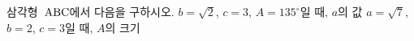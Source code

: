 삼각형~$\mathrm{ABC}$에서 다음을 구하시오.
 $b=\sqrt{2}$, $c=3$, $A=135^\circ$일 때, $a$의 값
 $a=\sqrt{7}$, $b=2$, $c=3$일 때, $A$의 크기
